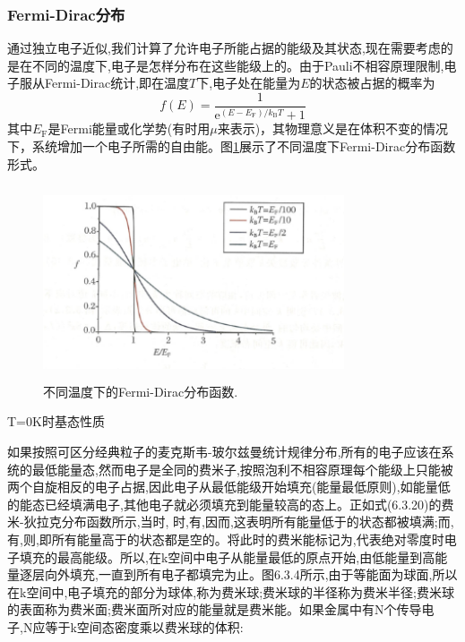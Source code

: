 \subsubsection{Fermi-Dirac分布} 
通过独立电子近似,我们计算了允许电子所能占据的能级及其状态,现在需要考虑的是在不同的温度下,电子是怎样分布在这些能级上的。由于Pauli不相容原理限制,电子服从Fermi-Dirac统计,即在温度$T$下,电子处在能量为$E$的状态被占据的概率为
\begin{equation}
	f(E)=\dfrac1{\mathrm{e}^{(E-E_{\mathrm{F}})/k_{\mathrm{B}}T}+1}
	\label{eq:Fermi_Dirac}
\end{equation}
其中$E_{\mathrm{F}}$是Fermi能量或化学势(有时用$\mu$来表示)，其物理意义是在体积不变的情况下，系统增加一个电子所需的自由能。图\ref{Fig:Fermi-Dirac}展示了不同温度下Fermi-Dirac分布函数形式。
\begin{figure}[h!]
\centering
\vspace*{-0.18in}
\includegraphics[height=2.25in,width=3.5in,viewport=0 0 70 45,clip]{Figures/Fermi-Dirac.png}
\caption{\small \textrm{不同温度下的Fermi-Dirac分布函数.}}%
\label{Fig:Fermi-Dirac}
\end{figure}





T=0K时基态性质

如果按照可区分经典粒子的麦克斯韦-玻尔兹曼统计规律分布,所有的电子应该在系统的最低能量态,然而电子是全同的费米子,按照泡利不相容原理每个能级上只能被两个自旋相反的电子占据,因此电子从最低能级开始填充(能量最低原则),如能量低的能态已经填满电子,其他电子就必须填充到能量较高的态上。正如式(6.3.20)的费米-狄拉克分布函数所示,当时, 时,有,因而,这表明所有能量低于的状态都被填满;而,有,则,即所有能量高于的状态都是空的。将此时的费米能标记为,代表绝对零度时电子填充的最高能级。所以,在k空间中电子从能量最低的原点开始,由低能量到高能量逐层向外填充,一直到所有电子都填完为止。图6.3.4所示,由于等能面为球面,所以在k空间中,电子填充的部分为球体,称为费米球;费米球的半径称为费米半径;费米球的表面称为费米面;费米面所对应的能量就是费米能。如果金属中有N个传导电子,N应等于k空间态密度乘以费米球的体积:

